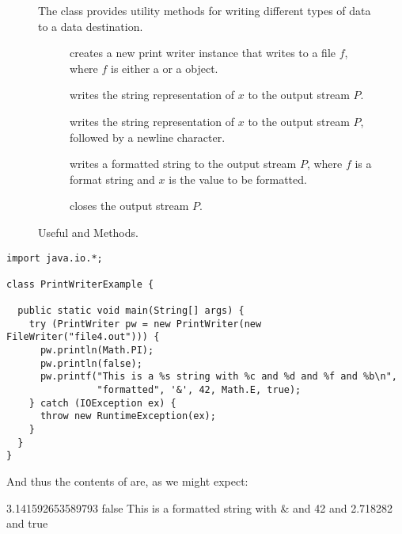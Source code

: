 \begin{figure}[tp]
  \small
  \begin{tcolorbox}[title=PrintWriter Methods]
    The  class provides utility methods for writing different types of data to a data destination.
    \vspace{2ex}
  \begin{description}
    \item [] creates a new print writer instance that writes to a file $f$, where $f$ is either a  or a  object.
    \item [] writes the string representation of $x$ to the output stream $P$.
    \item [] writes the string representation of $x$ to the output stream $P$, followed by a newline character.
    \item [] writes a formatted string to the output stream $P$, where $f$ is a format string and $x$ is the value to be formatted.
    \item [] closes the output stream $P$.
  \end{description}
\end{tcolorbox}
  \caption{Useful  and  Methods.}
  \label{fig:bwbr}
\end{figure}


\begin{lstlisting}[language=MyJava]
import java.io.*;

class PrintWriterExample {
  
  public static void main(String[] args) {
    try (PrintWriter pw = new PrintWriter(new FileWriter("file4.out"))) {
      pw.println(Math.PI);
      pw.println(false);
      pw.printf("This is a %s string with %c and %d and %f and %b\n", 
                "formatted", '&', 42, Math.E, true);
    } catch (IOException ex) { 
      throw new RuntimeException(ex); 
    }
  }
}
\end{lstlisting}

And thus the contents of  are, as we might expect:

\begin{verbnobox}[\small]
3.141592653589793
false
This is a formatted string with & and 42 and 2.718282 and true
\end{verbnobox}

